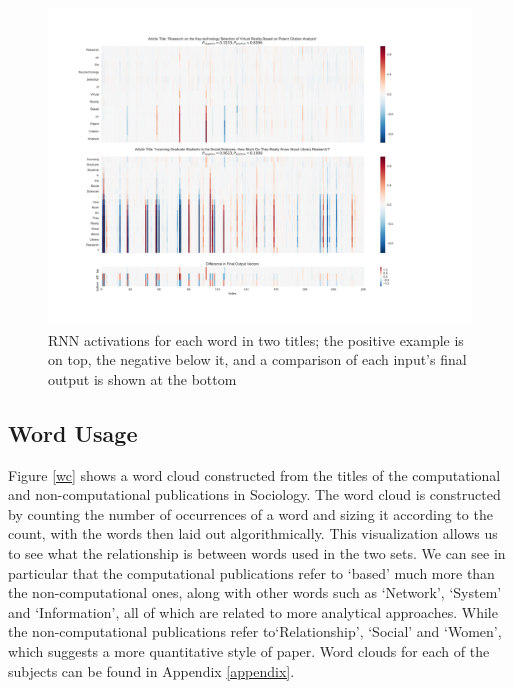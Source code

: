 \documentclass[12pt, a4paper]{article}
\begin{document}
\begin{figure}[ht]
	\centering
		\includegraphics[width=\textwidth]{visualize}
	\caption{RNN activations for each word in two titles; the positive example is on top, the negative below it, and a comparison of each input's final output is shown at the bottom}\label{visualize}
\end{figure}

\subsection{Word Usage}\label{word_count}

Figure \ref{wc} shows a word cloud constructed from the titles of the computational and non-computational publications in Sociology. The word cloud is constructed by counting the number of occurrences of a word and sizing it according to the count, with the words then laid out algorithmically. This visualization allows us to see what the relationship is between words used in the two sets. We can see in particular that the computational publications refer to `based' much more than the non-computational ones, along with other words such as `Network', `System' and `Information', all of which are related to more analytical approaches. While the non-computational publications refer to`Relationship', `Social' and `Women', which suggests a more quantitative style of paper. Word clouds for each of the subjects can be found in Appendix \ref{appendix}.
\end{document}
